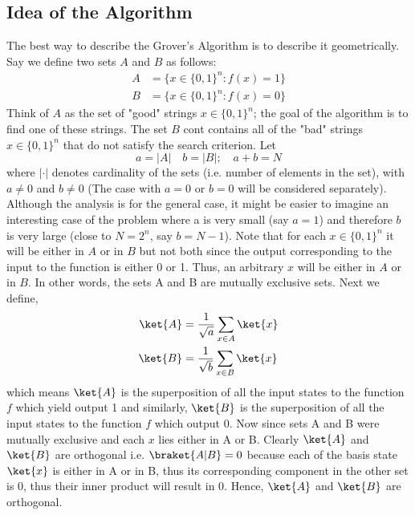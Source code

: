 \documentclass[12pt, oneside]{book}
\theoremstyle{definition}
\theoremstyle{definition}
\theoremstyle{remark}
\begin{document}
\subsection{Idea of the Algorithm}
The best way to describe the Grover's Algorithm is to describe it geometrically. Say we define two sets $A$ and $B$ as follows:
\begin{align*}
A&=\{x\in\{0,1\}^n: f(x)=1\}\\
B&=\{x\in\{0,1\}^n: f(x)=0\}
\end{align*}
Think of $A$ as the set of "good" strings $x \in \{0,1\}^n$; the goal of the algorithm is to find one of these strings. The set $B$ cont contains all of the "bad" strings $x\in\{0,1\}^n$ that do not satisfy the search criterion. Let
\[
a=|A| \quad b=|B|; \quad a+b=N
\]
where $|\cdot|$ denotes cardinality of the sets (i.e. number of elements in the set), with $a\neq 0$ and $b\neq 0$ (The case with $a=0$ or $b=0$ will be considered separately). Although the analysis is for the general case, it might be easier to imagine an interesting case of the problem where a is very small (say $a=1$) and therefore $b$ is very large (close to $N=2^n$, say $b=N-1$). Note that for each $x \in \{0,1\}^n$ it will be either in $A$ or in $B$ but not both since the output corresponding to the input to the function is either 0 or 1. Thus, an arbitrary $x$ will be either in $A$ or in $B$. In other words, the sets A and B are mutually exclusive sets.
Next we define, 
\begin{align*}
    \ket{A}&=\frac{1}{\sqrt{a}}\sum_{x\in A} \ket{x}\\
    \ket{B}&=\frac{1}{\sqrt{b}}\sum_{x \in B} \ket{x}
\end{align*}
which means $\ket{A}$ is the superposition of all the input states to the function $f$ which yield output 1 and similarly, $\ket{B}$ is the superposition of all the input states to the function $f$ which output 0. Now since sets A and B were mutually exclusive and each $x$ lies either in A or B. Clearly $\ket{A}$ and $\ket{B}$ are orthogonal i.e. $\braket{A|B}=0$ because each of the basis state $\ket{x}$ is either in A or in B, thus its corresponding component in the other set is 0, thus their inner product will result in 0. Hence, $\ket{A}$ and $\ket{B}$ are orthogonal. 
\end{document}
